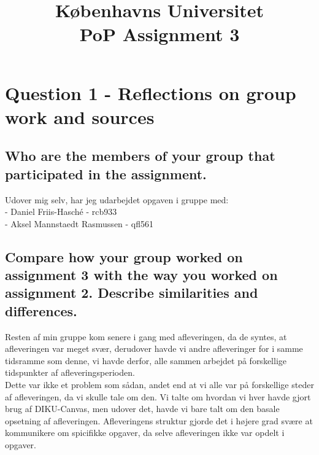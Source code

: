 \documentclass[a4paper,12pt]{article}
\begin{document}
% 

\title{Københavns Universitet\\
PoP Assignment 3}
\maketitle %

\section{Question 1 - Reflections on group work and sources}

\subsection{Who are the members of your group that participated in the assignment.}
Udover mig selv, har jeg udarbejdet opgaven i gruppe med:\\
- Daniel Friis-Hasché - rcb933\\
- Aksel Mannstaedt Rasmussen - qfl561

\subsection{Compare how your group worked on assignment 3 with the way you worked on assignment 2. Describe similarities and differences.}
Resten af min gruppe kom senere i gang med afleveringen, da de syntes, at afleveringen var meget svær, derudover havde vi andre afleveringer for i samme tidsramme som denne, vi havde derfor, alle sammen arbejdet på forskellige tidspunkter af afleveringsperioden.\\
Dette var ikke et problem som sådan, andet end at vi alle var på forskellige steder af afleveringen, da vi skulle tale om den. Vi talte om hvordan vi hver havde gjort brug af DIKU-Canvas, men udover det, havde vi bare talt om den basale opsetning af afleveringen. Afleveringens struktur gjorde det i højere grad svære at kommunikere om spicifikke opgaver, da selve afleveringen ikke var opdelt i opgaver.
\end{document}
